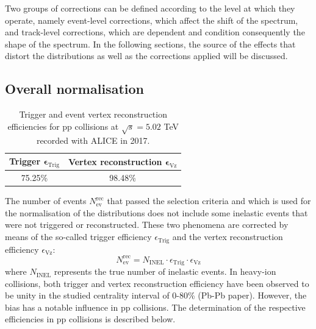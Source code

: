 \documentclass[12pt,a4paper]{report}
\begin{document}
Two groups of corrections can be defined according to the level at which they operate, namely event-level corrections, which affect the shift of the spectrum, and track-level corrections, which are \pt dependent and condition consequently the shape of the spectrum. In the following sections, the source of the effects that distort the \pt distributions as well as the corrections applied will be discussed.
\subsection{Overall normalisation}
\label{Norm}
\begin{table}[H]
\centering
\renewcommand{\arraystretch}{1.5}
\begin{tabular}{|c|c|}
\toprule
\rowcolor{headerBlue}  \textbf{Trigger} $\boldsymbol \epsilon_\text{Trig}$ &  \textbf{Vertex reconstruction} $\boldsymbol \epsilon_\text{Vz}$\\
\hline
75.25\%	&	98.48\%		 \\
\bottomrule
\end{tabular}
\caption{Trigger and event vertex reconstruction efficiencies for pp collisions at $\sqrt{s} = 5.02$ TeV recorded with ALICE in 2017.}
\label{tab:effs}
\end{table} 
The number of events $N_\text{ev}^\text{rec}$ that passed the selection criteria and which is used for the normalisation of the \pt distributions does not include some inelastic events that were not triggered or reconstructed. These two phenomena are corrected by means of the so-called trigger efficiency $\epsilon_\text{Trig}$ and the vertex reconstruction efficiency $\epsilon_\text{Vz}$:
\begin{equation}
N_\text{ev}^\text{rec} = N_\text{INEL}\cdot \epsilon_\text{Trig} \cdot \epsilon_\text{Vz}
\end{equation}
where $N_\text{INEL}$ represents the true number of inelastic events. In heavy-ion collisions, both trigger and vertex reconstruction efficiency have been observed to be unity in the studied centrality interval of 0-80\% (Pb-Pb paper). However, the bias has a notable influence in pp collisions. The determination of the respective efficiencies in pp collisions is described below.
\end{document}
